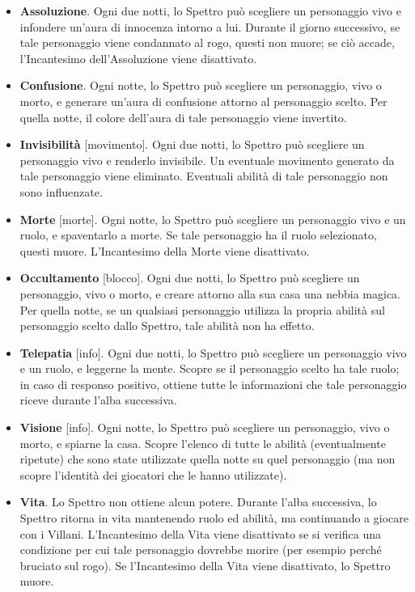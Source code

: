\documentclass[a4paper,10pt]{article}
\begin{document}
\begin{itemize}

      \item {\bf Assoluzione}. Ogni due notti, lo Spettro può scegliere un personaggio vivo e infondere un'aura di innocenza intorno a lui. Durante il giorno successivo, se tale personaggio viene condannato al rogo, questi non muore; se ciò accade, l'Incantesimo dell'Assoluzione viene disattivato.

      \item {\bf Confusione}. Ogni notte, lo Spettro può scegliere un personaggio, vivo o morto, e generare un'aura di confusione attorno al personaggio scelto. Per quella notte, il colore dell'aura di tale personaggio viene invertito.

      \item {\bf Invisibilità} [movimento]. Ogni due notti, lo Spettro può scegliere un personaggio vivo e renderlo invisibile. Un eventuale movimento generato da tale personaggio viene eliminato. Eventuali abilità di tale personaggio non sono influenzate.

      \item {\bf Morte} [morte]. Ogni notte, lo Spettro può scegliere un personaggio vivo e un ruolo, e spaventarlo a morte. Se tale personaggio ha il ruolo selezionato, questi muore. L'Incantesimo della Morte viene disattivato.

      \item {\bf Occultamento} [blocco]. Ogni due notti, lo Spettro può scegliere un personaggio, vivo o morto, e creare attorno alla sua casa una nebbia magica. Per quella notte, se un qualsiasi personaggio utilizza la propria abilità sul personaggio scelto dallo Spettro, tale abilità non ha effetto.

      \item {\bf Telepatia} [info]. Ogni due notti, lo Spettro può scegliere un personaggio vivo e un ruolo, e leggerne la mente. Scopre se il personaggio scelto ha tale ruolo; in caso di responso positivo, ottiene tutte le informazioni che tale personaggio riceve durante l'alba successiva.

      \item {\bf Visione} [info]. Ogni notte, lo Spettro può scegliere un personaggio, vivo o morto, e spiarne la casa. Scopre l'elenco di tutte le abilità (eventualmente ripetute) che sono state utilizzate quella notte su quel personaggio (ma non scopre l'identità dei giocatori che le hanno utilizzate).

      \item {\bf Vita}. Lo Spettro non ottiene alcun potere. Durante l'alba successiva, lo Spettro ritorna in vita mantenendo ruolo ed abilità, ma continuando a giocare con i Villani. L'Incantesimo della Vita viene disattivato se si verifica una condizione per cui tale personaggio dovrebbe morire (per esempio perché bruciato sul rogo). Se l'Incantesimo della Vita viene disattivato, lo Spettro muore.

\end{itemize}
\end{document}
